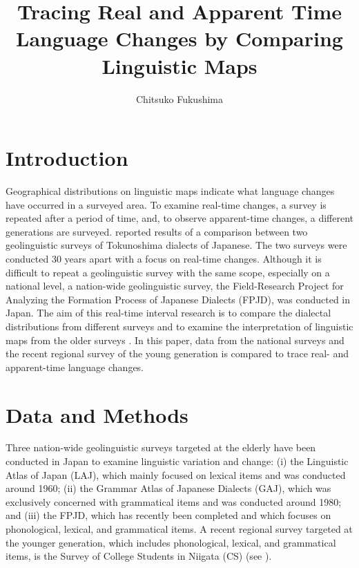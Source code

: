 \documentclass[output=paper]{LSP/langsci}
\author{Chitsuko Fukushima}
\title{Tracing Real and Apparent Time Language Changes by Comparing Linguistic Maps}
\begin{document}
\section{Introduction}
Geographical distributions on linguistic maps indicate what language changes have occurred in a surveyed area. To examine real-time changes, a survey is repeated after a period of time, and, to observe apparent-time changes, a different generations are surveyed. \citet{fukushima_revisiting_2013} reported results of a comparison between two geolinguistic surveys of Tokunoshima dialects of Japanese. The two surveys were conducted 30 years apart with a focus on real-time changes. Although it is difficult to repeat a geolinguistic survey with the same scope, especially on a national level, a nation-wide geolinguistic survey, the Field-Research Project for Analyzing the Formation Process of Japanese Dialects (FPJD), was conducted in Japan. The aim of this real-time interval research is to compare the dialectal distributions from different surveys and to examine the interpretation of linguistic maps from the older surveys \citep{onishi_timespan_2014}. In this paper, data from the national surveys and the recent regional survey of the young generation is compared to trace real- and apparent-time language changes.

\section{Data and Methods}

Three nation-wide geolinguistic surveys targeted at the elderly have been conducted in Japan to examine linguistic variation and change: (i) the Linguistic Atlas of Japan (LAJ), which mainly focused on lexical items and was conducted around 1960; (ii) the Grammar Atlas of Japanese Dialects (GAJ), which was exclusively concerned with grammatical items and was conducted around 1980; and (iii) the FPJD, which has recently been completed and which focuses on phonological, lexical, and grammatical items. A recent regional survey targeted at the younger generation, which includes phonological, lexical, and grammatical items, is the Survey of College Students in Niigata (CS) (see ).
\end{document}

